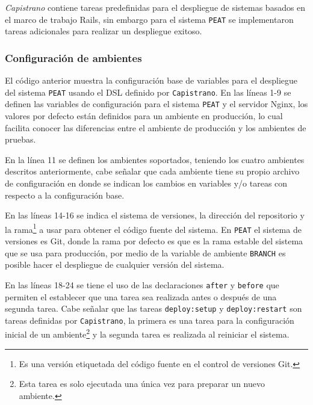 \textit{Capistrano} contiene tareas predefinidas para el despliegue de sistemas
basados en el marco de trabajo Rails, sin embargo para el sistema \texttt{PEAT} se
implementaron tareas adicionales para realizar un despliegue exitoso.

\subsubsection{Configuración de ambientes}



El código anterior muestra la configuración base de variables para el
despliegue del sistema \texttt{PEAT} usando el DSL definido por \texttt{Capistrano}.
En las líneas 1-9 se definen las variables de configuración para el sistema
\texttt{PEAT} y el servidor Nginx, los valores por defecto están definidos
para un ambiente en producción, lo cual facilita conocer las diferencias
entre el ambiente de producción y los ambientes de pruebas.

En la línea 11 se definen los ambientes soportados, teniendo los cuatro
ambientes descritos anteriormente, cabe señalar que cada ambiente tiene
su propio archivo de configuración en donde se indican los cambios en variables
y/o tareas con respecto a la configuración base.

En las líneas 14-16 se indica el sistema de versiones, la dirección del repositorio
y la rama\footnote{Es una versión etiquetada del código fuente en el control de
  versiones Git.} a usar para obtener el código fuente del sistema.
En \texttt{PEAT} el sistema de versiones es Git, donde la rama por defecto
es  que es la rama estable del sistema que
se usa para producción, por medio de la variable de ambiente \texttt{BRANCH} es
posible hacer el despliegue de cualquier versión del sistema.

En las líneas 18-24 se tiene el uso de las declaraciones \texttt{after}
y \texttt{before} que permiten el establecer que una tarea sea realizada
antes o después de una segunda tarea. Cabe señalar que las tareas
\texttt{deploy:setup} y \texttt{deploy:restart} son tareas definidas
por \texttt{Capistrano}, la primera es una tarea para la configuración inicial
de un ambiente\footnote{Esta tarea es solo ejecutada una única vez para preparar
  un nuevo ambiente.} y la segunda tarea es realizada al reiniciar el sistema.



